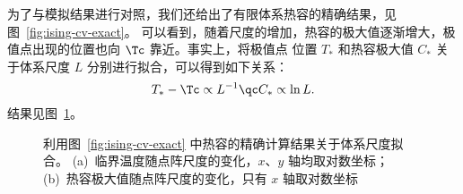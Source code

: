 为了与模拟结果进行对照，我们还给出了有限体系热容的精确结果，见图~\ref{fig:ising-cv-exact}。
可以看到，随着尺度的增加，热容的极大值逐渐增大，极值点出现的位置也向 $\Tc$ 靠近。事实上，将极值点
位置 $T_*$ 和热容极大值 $C_*$ 关于体系尺度 $L$ 分别进行拟合，可以得到如下关系：
\begin{equation}
  T_* - \Tc \propto L^{-1} \qc
  C_*       \propto \ln L.
\end{equation}
结果见图~\ref{fig:ising-fit}。

\begin{figure}
  \begin{subfigure}[b]{0.47\textwidth}
    \hfill
  \end{subfigure}
  \begin{subfigure}[b]{0.47\textwidth}
    \hfill
  \end{subfigure}
  \caption{利用图~\ref{fig:ising-cv-exact} 中热容的精确计算结果关于体系尺度拟合。
    (a)~临界温度随点阵尺度的变化，$x$、$y$ 轴均取对数坐标；
    (b)~热容极大值随点阵尺度的变化，只有 $x$ 轴取对数坐标}
  \label{fig:ising-fit}
\end{figure}
